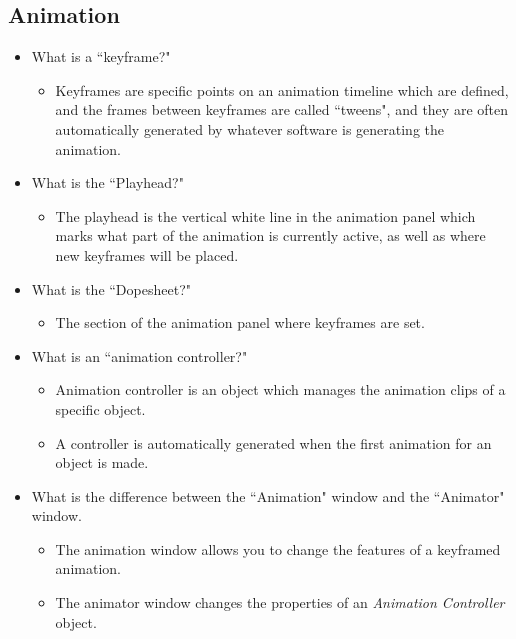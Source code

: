 \documentclass{article}
\begin{document}
\subsection{Animation}
\begin{itemize}
    \item What is a ``keyframe?"
    \begin{itemize}
        \item Keyframes are specific points on an animation timeline which are defined, and the frames between keyframes are called ``tweens", and they are often automatically generated by whatever software is generating the animation.
    \end{itemize}
    \item What is the ``Playhead?"
    \begin{itemize}
        \item The playhead is the vertical white line in the animation panel which marks what part of the animation is currently active, as well as where new keyframes will be placed.
    \end{itemize}
    \item What is the ``Dopesheet?"
    \begin{itemize}
        \item The section of the animation panel where keyframes are set.
    \end{itemize}
    \item What is an ``animation controller?"
    \begin{itemize}
        \item Animation controller is an object which manages the animation clips of a specific object.
        \item A controller is automatically generated when the first animation for an object is made.
    \end{itemize}
    \item What is the difference between the ``Animation" window and the ``Animator" window.
    \begin{itemize}
        \item The animation window allows you to change the features of a keyframed animation.
        \item The animator window changes the properties of an \textit{Animation Controller} object.
    \end{itemize}
\end{itemize}
\end{document}
